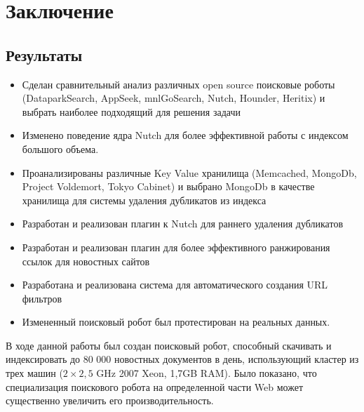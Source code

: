 \chapter*{Заключение} 
\section*{Результаты}
\begin{itemize}
 \item Сделан сравнительный анализ различных open source поисковые роботы (DataparkSearch,
AppSeek, mnlGoSearch, Nutch, Hounder, Heritix) и выбрать наиболее подходящий для
решения задачи
 \item Изменено поведение ядра Nutch для более эффективной работы с индексом большого объема.
 \item Проанализированы различные Key Value хранилища (Memcached, MongoDb, Project Voldemort, Tokyo Cabinet) и выбрано MongoDb в качестве хранилища для системы удаления дубликатов из индекса
 \item Разработан и реализован плагин к Nutch для раннего удаления дубликатов
 \item Разработан и реализован плагин для более эффективного ранжирования ссылок для новостных сайтов
 \item Разработана и реализована система для автоматического создания URL фильтров
 \item Измененный поисковый робот был протестирован на реальных данных.
\end{itemize}
В ходе данной работы был создан поисковый робот, способный скачивать и индексировать до 80 000 новостных документов в день, использующий кластер из трех машин ($2\times2,5$ GHz 2007 Xeon, 1,7GB RAM). Было показано, что специализация поискового робота на определенной части Web может существенно увеличить его производительность.
